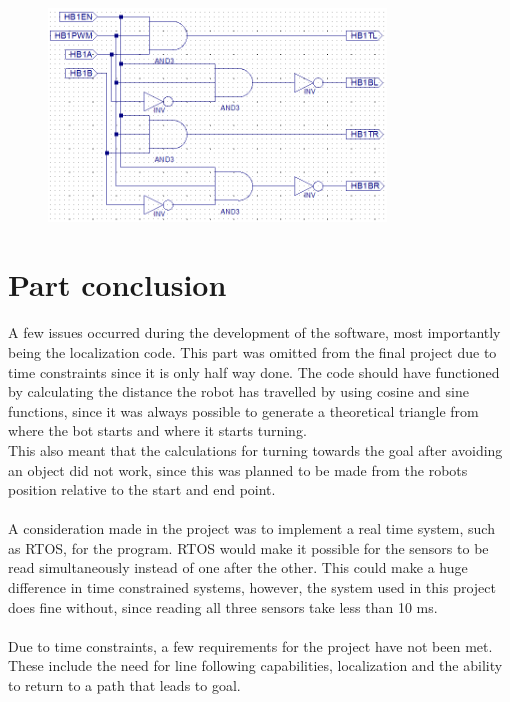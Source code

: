 \begin{figure}[!ht]
	\centering
	\includegraphics[width=0.8\textwidth]{figures/cpldlogic.png}
	\caption{}
	\label{hbridgecpldlogic}
\end{figure}
\newpage

\section{Part conclusion}
A few issues occurred during the development of the software, most importantly being the localization code. This part was omitted from the final project due to time constraints since it is only half way done. The code should have functioned by calculating the distance the robot has travelled by using cosine and sine functions, since it was always possible to generate a theoretical triangle from where the bot starts and where it starts turning.\\
This also meant that the calculations for turning towards the goal after avoiding an object did not work, since this was planned to be made from the robots position relative to the start and end point.\\\\
A consideration made in the project was to implement a real time system, such as RTOS, for the program. RTOS would make it possible for the sensors to be read simultaneously instead of one after the other. This could make a huge difference in time constrained systems, however, the system used in this project does fine without, since reading all three sensors take less than 10 ms.\\\\
Due to time constraints, a few requirements for the project have not been met. These include the need for line following capabilities, localization and the ability to return to a path that leads to goal.
